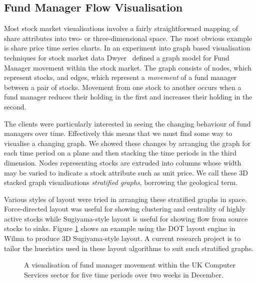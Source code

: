 \documentclass[runningheads]{cl2emult}
\begin{document}
\subsection{Fund Manager Flow Visualisation} \label{sec:fmflow}
Most stock market visualisations involve a fairly straightforward
mapping of share attributes into two- or three-dimensional space.  The most
obvious example is share price time series charts.  In an experiment
into graph based visualisation techniques for stock market data
Dwyer~\cite{dwyer02fmflow} defined a graph model for Fund Manager
movement within the stock market.  The graph consists of nodes,
which represent stocks, and edges, which represent a {\em movement} of a
fund manager between a pair of stocks.  Movement from one stock to
another occurs when a fund manager reduces their holding in the first
and increases their holding in the second.

The clients were particularly interested in seeing the changing
behaviour of fund managers over time.  Effectively this means that we
must find some way to visualise a changing graph.  We showed these changes by
arranging the graph for each time period on a plane and then stacking
the time periods in the third dimension.  Nodes representing stocks
are extruded into columns whose width may be varied to indicate a
stock attribute such as unit price.  We call these 3D stacked graph
visualisations {\em stratified graphs}, borrowing the geological term.

Various styles of layout were tried in arranging these stratified
graphs in space.  Force-directed layout was useful for showing clustering and centrality of
highly active stocks while Sugiyama-style layout is useful for showing
flow from source stocks to sinks.  Figure \ref{fig-fm} shows an
example using the DOT layout engine in Wilma to produce 3D Sugiyama-style layout.  A current research project is to tailor the hueristics
used in these layout algorithms to suit such stratified graphs.

\begin{figure}[h]
  \centering
  \caption{A visualisation of fund manager movement within the UK
  Computer Services sector for five time periods over two weeks in December.}
  \label{fig-fm}
\end{figure}
\end{document}
